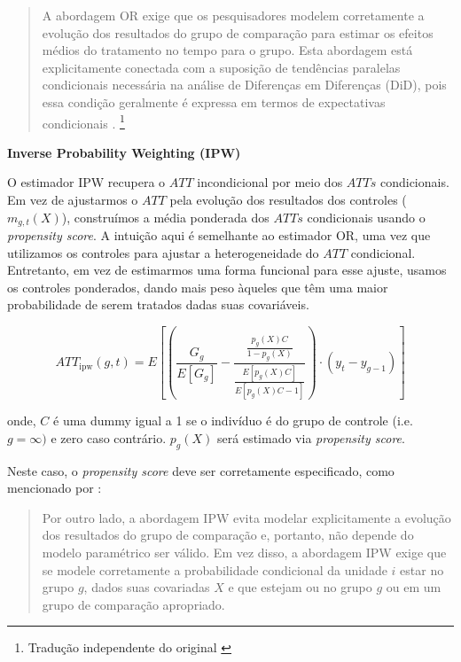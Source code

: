 \documentclass[portugues]{article}
\begin{document}
\begin{quotation}
A abordagem OR exige que os pesquisadores modelem corretamente a evolução dos resultados do grupo de comparação para estimar os efeitos médios do tratamento no tempo para o grupo. Esta abordagem está explicitamente conectada com a suposição de tendências paralelas condicionais necessária na análise de Diferenças em Diferenças (DiD), pois essa condição geralmente é expressa em termos de expectativas condicionais \citep{callaway2021difference}. \footnote{Tradução independente do original \cite{callaway2021difference}}
\end{quotation}

\vspace{3mm}

\textbf{Inverse Probability Weighting (IPW)}

\vspace{2mm}

O estimador IPW recupera o \(ATT\) incondicional por meio dos \(ATTs\) condicionais. Em vez de ajustarmos o \(ATT\) pela evolução dos resultados dos controles (\(m_{g,t}(X)\)), construímos a média ponderada dos \(ATTs\) condicionais usando o \textit{propensity score}. A intuição aqui é semelhante ao estimador OR, uma vez que utilizamos os controles para ajustar a heterogeneidade do \(ATT\) condicional. Entretanto, em vez de estimarmos uma forma funcional para esse ajuste, usamos os controles ponderados, dando mais peso àqueles que têm uma maior probabilidade de serem tratados dadas suas covariáveis.

\begin{equation}
    ATT_{\text{ipw}}(g,t) = E\left[\left(\frac{G_g}{E[G_g]} - \frac{\frac{p_g(X)C}{1-p_g(X)}}{\frac{E[p_g(X)C]}{E[p_g(X)C-1]}}\right) \cdot \left(y_{t} - y_{g-1}\right)\right]
\end{equation}

\noindent onde, \(C\) é uma dummy igual a 1 se o indivíduo é do grupo de controle (i.e. \(g=\infty)\) e zero caso contrário. \(p_g(X)\) será estimado via \textit{propensity score}. 

Neste caso, o \textit{propensity score} deve ser corretamente especificado, como mencionado por \cite{callaway2021difference}:

\begin{quotation}
    Por outro lado, a abordagem IPW evita modelar explicitamente a evolução dos resultados do grupo de comparação e, portanto, não depende do modelo paramétrico ser válido. Em vez disso, a abordagem IPW exige que se modele corretamente a probabilidade condicional da unidade $i$ estar no grupo $g$, dados suas covariadas $X$ e que estejam ou no grupo $g$ ou em um grupo de comparação apropriado.
\end{quotation}
\end{document}
